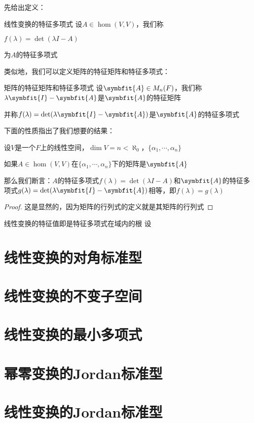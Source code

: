 \documentclass[12pt, a4paper, oneside, UTF8]{ctexbook}
\begin{document}
			先给出定义：
			\begin{defn}{线性变换的特征多项式}{}
				设$A \in \hom(V,V)$，我们称

				$f(\lambda )=\det(\lambda I-A)$

				为$A$的特征多项式
			\end{defn}
			类似地，我们可以定义矩阵的特征矩阵和特征多项式：
			\begin{defn}{矩阵的特征矩阵和特征多项式}{}
				设$\symbfit{A}\in M_n(F)$，我们称$\lambda \symbfit{I}-\symbfit{A}$是$\symbfit{A}$的特征矩阵

				并称$f(\lambda )=\det(\lambda \symbfit{I}-\symbfit{A})$是$\symbfit{A}$的特征多项式
			\end{defn}
			下面的性质指出了我们想要的结果：
			\begin{para}{0}
				\point{}
					\begin{proposition}
						设$V$是一个$F$上的线性空间，$\dim V = n < \aleph_0$，$\{\alpha_1,\cdots,\alpha_n\}$

						如果$A \in \hom(V,V)$在$\{\alpha_1,\cdots,\alpha_n\}$下的矩阵是$\symbfit{A}$

						那么我们断言：$A$的特征多项式$f(\lambda )=\det(\lambda I-A)$和$\symbfit{A}$的特征多项式$g(\lambda )=\det(\lambda \symbfit{I}-\symbfit{A})$相等，即$f(\lambda )=g(\lambda )$
					\end{proposition}
					\begin{proof}
						这是显然的，因为矩阵的行列式的定义就是其矩阵的行列式
					\end{proof}
				\point{}
					\begin{them}{线性变换的特征值即是特征多项式在域内的根}{}
						设
					\end{them}
			\end{para}
	\section{线性变换的对角标准型}
	\section{线性变换的不变子空间}
	\section{线性变换的最小多项式}
	\section{幂零变换的Jordan标准型}
	\section{线性变换的Jordan标准型}
\ifx\allfiles\undefined
\end{document}
